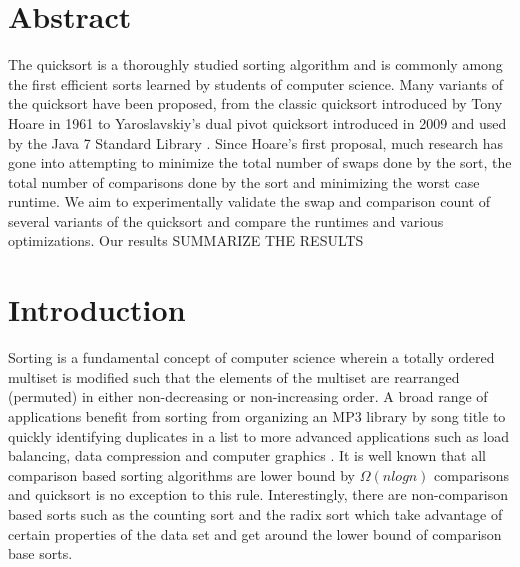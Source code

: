 %
\section{Abstract}
    The quicksort is a thoroughly studied sorting algorithm and is commonly among the first efficient sorts learned by students of computer science. Many variants of the quicksort have been proposed, from the classic quicksort introduced by Tony Hoare in 1961 \cite{} to Yaroslavskiy’s dual pivot quicksort introduced in 2009 and used by the Java 7 Standard Library \cite{}. Since Hoare’s first proposal, much research has gone into attempting to minimize the total number of swaps done by the sort, the total number of comparisons done by the sort and minimizing the worst case runtime. We aim to experimentally validate the swap and comparison count of several variants of the quicksort and compare the runtimes and various optimizations. Our results SUMMARIZE THE RESULTS

\section{Introduction}
    Sorting is a fundamental concept of computer science wherein a totally ordered multiset is modified such that the elements of the multiset are rearranged (permuted) in either non-decreasing or non-increasing order. A broad range of applications benefit from sorting from organizing an MP3 library by song title to quickly identifying duplicates in a list to more advanced applications such as load balancing, data compression and computer graphics \cite{}. It is well known that all comparison based sorting algorithms are lower bound by $\Omega(n log n)$ comparisons \cite{} and quicksort is no exception to this rule. Interestingly, there are non-comparison based sorts such as the counting sort and the radix sort which take advantage of certain properties of the data set and get around the lower bound of comparison base sorts.
    
